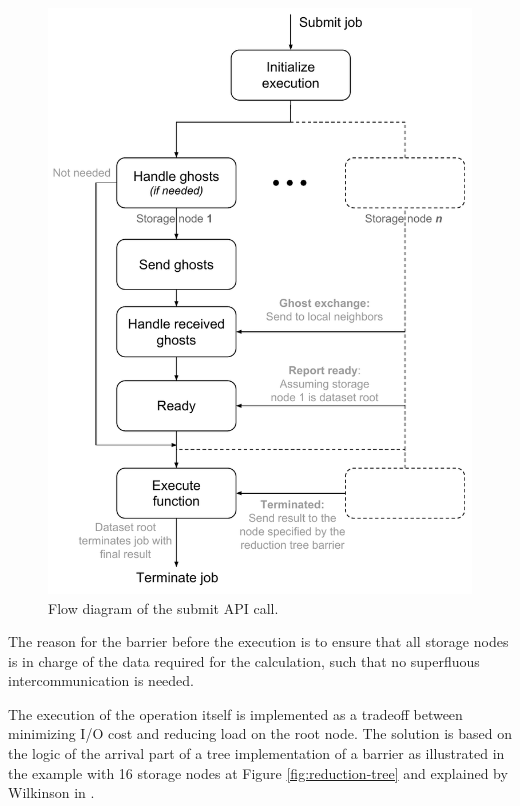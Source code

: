 \begin{figure}
	\centering
	\includegraphics[scale=0.7]{pdf/submit-job.pdf}
	\caption{Flow diagram of the submit API call. \label{fig:submit-job}}
\end{figure}	

\noindent
The reason for the barrier before the execution is to ensure that all storage nodes is in charge of the data required for the calculation, such that no superfluous intercommunication is needed.
\newline

The execution of the operation itself is implemented as a tradeoff between minimizing I/O cost and reducing load on the root node. The solution is based on the logic of the arrival part of a tree implementation of a barrier as illustrated in the example with 16 storage nodes at Figure \ref{fig:reduction-tree} and explained by Wilkinson \etal in \cite{Wilkinson:1998:PPT:289352}.

